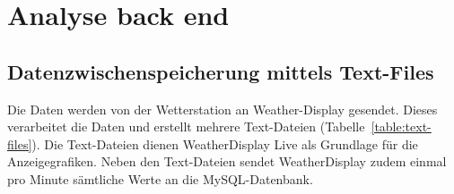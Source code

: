 
\section{Analyse back end}
%

\subsection{Datenzwischenspeicherung mittels Text-Files}
Die Daten werden von der Wetterstation an Weather-Display gesendet. Dieses verarbeitet die Daten und erstellt mehrere Text-Dateien (Tabelle~\ref{table:text-files}). Die Text-Dateien dienen WeatherDisplay Live als Grundlage für die Anzeigegrafiken. Neben den Text-Dateien sendet WeatherDisplay zudem einmal pro Minute sämtliche Werte an die MySQL-Datenbank.


